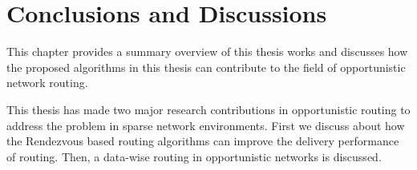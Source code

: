 \chapter{Conclusions and Discussions}
\label{cf}


This chapter provides a summary overview of this thesis works and discusses how the proposed algorithms in this thesis can contribute to the field of opportunistic network routing.


This thesis has made two major research contributions in opportunistic routing to address the problem in sparse network environments.
First we discuss about how the Rendezvous based routing algorithms can improve the delivery performance of routing.
Then, a data-wise routing in opportunistic networks is discussed.

